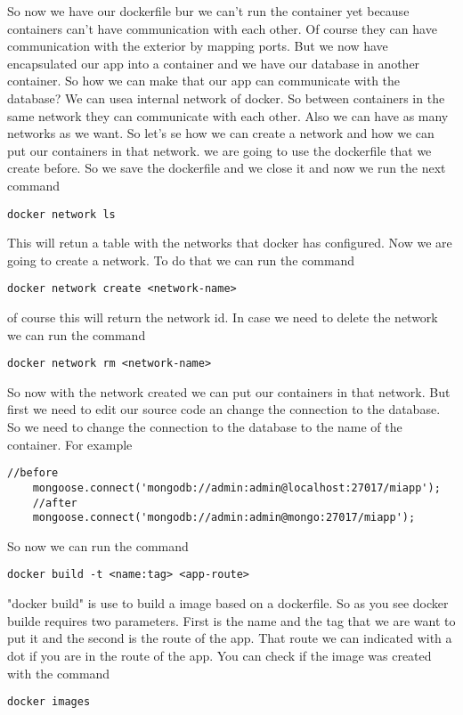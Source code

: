 \documentclass{article}
\begin{document}
So now we have our dockerfile bur we can't run the container yet because containers can't have communication with each other.
Of course they can have communication with the exterior by mapping ports. But we now have encapsulated our app into a container 
and we have our database in another container. So how we can make that our app can communicate with the database? 
We can usea internal network of docker. So between containers in the same network they can communicate with each other. Also we can 
have as many networks as we want. So let's se how we can create a network and how we can put our containers in that network.
we are going to use the dockerfile that we create before. So we save the dockerfile and we close it and now we run the next 
command
\begin{lstlisting}[breaklines=true, breakatwhitespace=true]
    docker network ls 
\end{lstlisting}

This will retun a table with the networks that docker has configured. Now we are going to create a network. To do that we can run the command
\begin{lstlisting}[breaklines=true, breakatwhitespace=true]
    docker network create <network-name>
\end{lstlisting}
of course this will return the network id. In case we need to delete the network we can run the command
\begin{lstlisting}[breaklines=true, breakatwhitespace=true]
    docker network rm <network-name>
\end{lstlisting}
So now with the network created we can put our containers in that network. But first we need to edit our source code 
an change the connection to the database. So we need to change the connection to the database to the name of the container. For example
\begin {lstlisting}[breaklines=true, breakatwhitespace=true]
    //before
    mongoose.connect('mongodb://admin:admin@localhost:27017/miapp'); 
    //after
    mongoose.connect('mongodb://admin:admin@mongo:27017/miapp');
\end{lstlisting}

So now we can run the command
\begin{lstlisting}[breaklines=true, breakatwhitespace=true]
    docker build -t <name:tag> <app-route>
\end{lstlisting}

"docker build" is use to build a image based on a dockerfile. So as you see docker builde requires two parameters. 
First is the name and the tag that we are want to put it and the second is the route of the app. That route we can 
indicated with a dot if you are in the route of the app. You can check if the image was created with the command
\begin{lstlisting}[breaklines=true, breakatwhitespace=true]
    docker images
\end{lstlisting}
 
\end{document}
